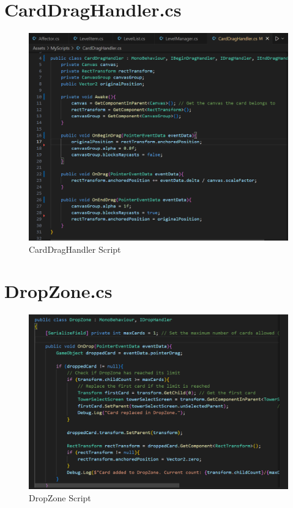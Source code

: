 \documentclass[12pt,a4paper]{report}
\begin{document}
\section{CardDragHandler.cs}
\begin{figure}[h!]
	\centering
	\includegraphics[scale=0.75]{images/CardDragHandler.png}
	\caption{CardDragHandler Script }
	\label{fig:CardDragHandler}
\end{figure}

\section{DropZone.cs}
\begin{figure}[h!]
	\centering
	\includegraphics[scale=0.75]{images/DropZone.png}
	\caption{DropZone Script }
	\label{fig:DropZone}
\end{figure}
\end{document}
